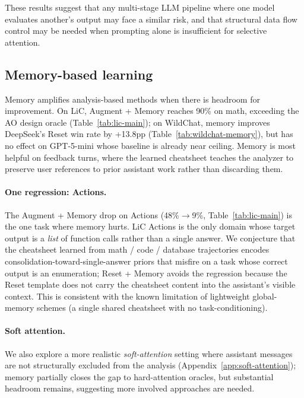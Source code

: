 \documentclass{article}
\begin{document}
These results suggest that any multi-stage LLM pipeline where one model evaluates another's output may face a similar risk, and that structural data flow control may be needed when prompting alone is insufficient for selective attention.


\subsection{Memory-based learning}
\label{sec:memory-discussion}

Memory amplifies analysis-based methods when there is headroom for improvement. On LiC, Augment + Memory reaches 90\% on math, exceeding the AO design oracle (Table~\ref{tab:lic-main}); on WildChat, memory improves DeepSeek's Reset win rate by +13.8pp (Table~\ref{tab:wildchat-memory}), but has no effect on GPT-5-mini whose baseline is already near ceiling. Memory is most helpful on feedback turns, where the learned cheatsheet teaches the analyzer to preserve user references to prior assistant work rather than discarding them.

\paragraph{One regression: Actions.} The Augment + Memory drop on Actions (48\%$\to$9\%, Table~\ref{tab:lic-main}) is the one task where memory hurts. LiC Actions is the only domain whose target output is a \emph{list} of function calls rather than a single answer. We conjecture that the cheatsheet learned from math / code / database trajectories encodes consolidation-toward-single-answer priors that misfire on a task whose correct output is an enumeration; Reset + Memory avoids the regression because the Reset template does not carry the cheatsheet content into the assistant's visible context. This is consistent with the known limitation of lightweight global-memory schemes (a single shared cheatsheet with no task-conditioning).

\paragraph{Soft attention.} We also explore a more realistic \emph{soft-attention} setting where assistant messages are not structurally excluded from the analysis (Appendix~\ref{app:soft-attention}); memory partially closes the gap to hard-attention oracles, but substantial headroom remains, suggesting more involved approaches are needed.
\end{document}
